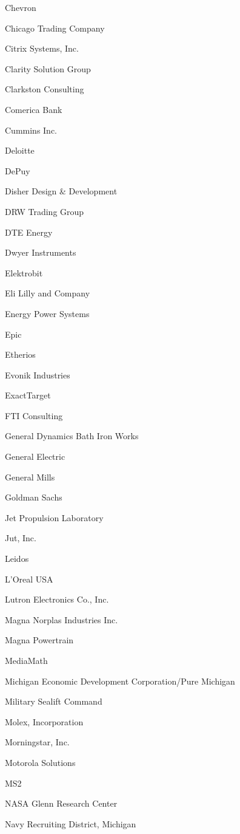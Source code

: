 \documentclass[twoside]{article}
\begin{document}
\begin{center}
\begin{multicols}{5}
\begin{FlushLeft}
\begin{compactitem}
\item Chevron
\item Chicago Trading Company
\item Citrix Systems, Inc.
\item Clarity Solution Group
\item Clarkston Consulting
\item Comerica Bank
\item Cummins Inc.
\item Deloitte
\item DePuy
\item Disher Design \& Development
\item DRW Trading Group
\item DTE Energy
\item Dwyer Instruments
\item Elektrobit
\item Eli Lilly and Company
\item Energy Power Systems
\item Epic
\item Etherios
\item Evonik Industries
\item ExactTarget
\item FTI Consulting
\item General Dynamics Bath Iron Works
\item General Electric
\item General Mills
\item Goldman Sachs
\item Jet Propulsion Laboratory
\item Jut, Inc.
\item Leidos
\item L'Oreal USA
\item Lutron Electronics Co., Inc.
\item Magna Norplas Industries Inc.
\item Magna Powertrain
\item MediaMath
\item Michigan Economic Development Corporation/Pure Michigan
\item Military Sealift Command
\item Molex, Incorporation
\item Morningstar, Inc.
\item Motorola Solutions
\item MS2
\item NASA Glenn Research Center
\item Navy Recruiting District, Michigan

\end{compactitem}
\end{FlushLeft}
\end{multicols}
\end{center}
\end{document}
